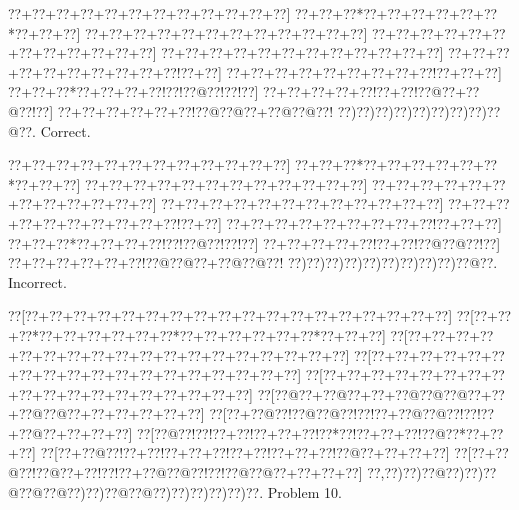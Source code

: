 \documentclass[a5paper]{article}
\begin{document}
\begin{center}
{\goo
\0??+\0??+\0??+\0??+\0??+\0??+\0??+\0??+\0??+\0??+\0??+\0??]
\0??+\0??+\0??*\0??+\0??+\0??+\0??+\0??+\0??*\0??+\0??+\0??]
\0??+\0??+\0??+\0??+\0??+\0??+\0??+\0??+\0??+\0??+\0??+\0??]
\0??+\0??+\0??+\0??+\0??+\0??+\0??+\0??+\0??+\0??+\0??+\0??]
\0??+\0??+\0??+\0??+\0??+\0??+\0??+\0??+\0??+\0??+\0??+\0??]
\0??+\0??+\0??+\0??+\0??+\0??+\0??+\0??+\0??+\0??!\0??+\0??]
\0??+\0??+\0??+\0??+\0??+\0??+\0??+\0??+\0??!\0??+\0??+\0??]
\0??+\0??+\0??*\0??+\0??+\0??+\0??!\0??!\0??@\0??!\0??!\0??]
\0??+\0??+\0??+\0??+\0??!\0??+\0??!\0??@\0??+\0??@\0??!\0??]
\0??+\0??+\0??+\0??+\0??+\0??!\0??@\0??@\0??+\0??@\0??@\0??!
\0??)\0??)\0??)\0??)\0??)\0??)\0??)\0??)\0??@\0??.
}
Correct. 

\end{center}
\begin{center}
{\goo
\0??+\0??+\0??+\0??+\0??+\0??+\0??+\0??+\0??+\0??+\0??+\0??]
\0??+\0??+\0??*\0??+\0??+\0??+\0??+\0??+\0??*\0??+\0??+\0??]
\0??+\0??+\0??+\0??+\0??+\0??+\0??+\0??+\0??+\0??+\0??+\0??]
\0??+\0??+\0??+\0??+\0??+\0??+\0??+\0??+\0??+\0??+\0??+\0??]
\0??+\0??+\0??+\0??+\0??+\0??+\0??+\0??+\0??+\0??+\0??+\0??]
\0??+\0??+\0??+\0??+\0??+\0??+\0??+\0??+\0??+\0??!\0??+\0??]
\0??+\0??+\0??+\0??+\0??+\0??+\0??+\0??+\0??!\0??+\0??+\0??]
\0??+\0??+\0??*\0??+\0??+\0??+\0??!\0??!\0??@\0??!\0??!\0??]
\0??+\0??+\0??+\0??+\0??!\0??+\0??!\0??@\0??@\0??!\0??]
\0??+\0??+\0??+\0??+\0??+\0??!\0??@\0??@\0??+\0??@\0??@\0??!
\0??)\0??)\0??)\0??)\0??)\0??)\0??)\0??)\0??)\0??@\0??.
}
Incorrect. 

\end{center}
\newpage
\begin{center}
{\goo
\0??[\0??+\0??+\0??+\0??+\0??+\0??+\0??+\0??+\0??+\0??+\0??+\0??+\0??+\0??+\0??+\0??+\0??+\0??]
\0??[\0??+\0??+\0??*\0??+\0??+\0??+\0??+\0??+\0??*\0??+\0??+\0??+\0??+\0??+\0??*\0??+\0??+\0??]
\0??[\0??+\0??+\0??+\0??+\0??+\0??+\0??+\0??+\0??+\0??+\0??+\0??+\0??+\0??+\0??+\0??+\0??+\0??]
\0??[\0??+\0??+\0??+\0??+\0??+\0??+\0??+\0??+\0??+\0??+\0??+\0??+\0??+\0??+\0??+\0??+\0??+\0??]
\0??[\0??+\0??+\0??+\0??+\0??+\0??+\0??+\0??+\0??+\0??+\0??+\0??+\0??+\0??+\0??+\0??+\0??+\0??]
\0??[\0??@\0??+\0??@\0??+\0??+\0??@\0??@\0??@\0??+\0??+\0??@\0??@\0??+\0??+\0??+\0??+\0??+\0??]
\0??[\0??+\0??@\0??!\0??@\0??@\0??!\0??!\0??+\0??@\0??@\0??!\0??!\0??+\0??@\0??+\0??+\0??+\0??]
\0??[\0??@\0??!\0??!\0??+\0??!\0??+\0??+\0??!\0??*\0??!\0??+\0??+\0??!\0??@\0??*\0??+\0??+\0??]
\0??[\0??+\0??@\0??!\0??+\0??!\0??+\0??+\0??!\0??+\0??!\0??+\0??+\0??!\0??@\0??+\0??+\0??+\0??]
\0??[\0??+\0??@\0??!\0??@\0??+\0??!\0??!\0??+\0??@\0??@\0??!\0??!\0??@\0??@\0??+\0??+\0??+\0??]
\0??,\0??)\0??)\0??@\0??)\0??)\0??@\0??@\0??@\0??)\0??)\0??@\0??@\0??)\0??)\0??)\0??)\0??)\0??.
}
Problem 10.

\end{center}
\end{document}
